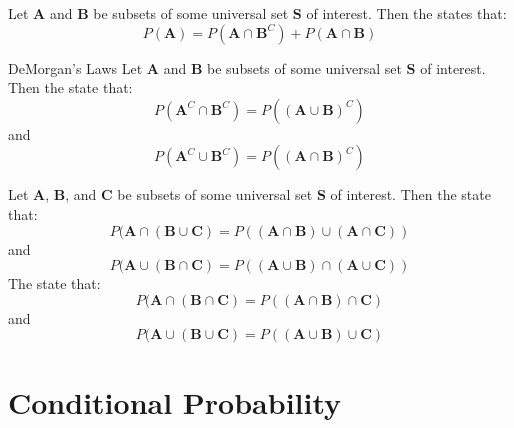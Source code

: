 \documentclass[12pt]{report}
\begin{document}
\begin{prop}{}{}
    Let $\mathbf{A}$ and $\mathbf{B}$ be subsets of some universal set $\mathbf{S}$ of interest. Then the  states that: \begin{equation*}
        P(\mathbf{A}) = P(\mathbf{A}\cap\mathbf{B}^C) + P(\mathbf{A}\cap\mathbf{B})
    \end{equation*}
\end{prop}



\begin{namthm}{DeMorgan's Laws}{}
    Let $\mathbf{A}$ and $\mathbf{B}$ be subsets of some universal set $\mathbf{S}$ of interest. Then the  state that: \begin{equation*}
        P(\mathbf{A}^C\cap\mathbf{B}^C) = P((\mathbf{A}\cup\mathbf{B})^C)
    \end{equation*}
    and \begin{equation*}
        P(\mathbf{A}^C\cup\mathbf{B}^C) = P((\mathbf{A}\cap\mathbf{B})^C)
    \end{equation*}
\end{namthm}

\begin{prop}{}{}
    Let $\mathbf{A}$, $\mathbf{B}$, and $\mathbf{C}$ be subsets of some universal set $\mathbf{S}$ of interest. Then the  state that: \begin{equation*}
        P(\mathbf{A}\cap(\mathbf{B}\cup\mathbf{C}) = P((\mathbf{A}\cap\mathbf{B})\cup(\mathbf{A}\cap\mathbf{C}))    
    \end{equation*}
    and \begin{equation*}
        P(\mathbf{A}\cup(\mathbf{B}\cap\mathbf{C}) = P((\mathbf{A}\cup\mathbf{B})\cap(\mathbf{A}\cup\mathbf{C})) 
    \end{equation*}
    The  state that: \begin{equation*}
        P(\mathbf{A}\cap(\mathbf{B}\cap\mathbf{C}) = P((\mathbf{A}\cap\mathbf{B})\cap\mathbf{C})    
    \end{equation*}
    and \begin{equation*}
        P(\mathbf{A}\cup(\mathbf{B}\cup\mathbf{C}) = P((\mathbf{A}\cup\mathbf{B})\cup\mathbf{C}) 
    \end{equation*}
\end{prop}


\section{Conditional Probability}
\end{document}
